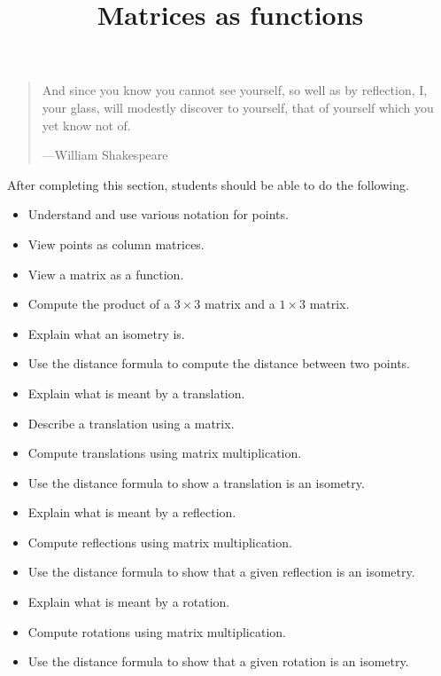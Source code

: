 \documentclass{ximera}
\title{Matrices as functions}
\begin{document}
\begin{abstract}
\end{abstract}
\maketitle

\begin{quote}
And since you know you cannot see yourself, so well as by reflection,
I, your glass, will modestly discover to yourself, that of yourself
which you yet know not of.

\hfill---William Shakespeare
\end{quote}
After completing this section, students should be able to do the following.

\begin{itemize}
  \item Understand and use various notation for points.
  \item View points as column matrices.
  \item View a matrix as a function.
  \item Compute the product of a $3\times 3$ matrix and a $1\times 3$ matrix.
  \item Explain what an isometry is.
  \item Use the distance formula to compute the distance between two points.
  \item Explain what is meant by a translation.
  \item Describe a translation using a matrix.
  \item Compute translations using matrix multiplication.
  \item Use the distance formula to show a translation is an isometry.
  \item Explain what is meant by a reflection.
  \item Compute reflections using matrix multiplication.
  \item Use the distance formula to show that a given reflection is an isometry.
  \item Explain what is meant by a rotation.
  \item Compute rotations using matrix multiplication.
  \item Use the distance formula to show that a given rotation is an isometry.
\end{itemize}
\end{document}
